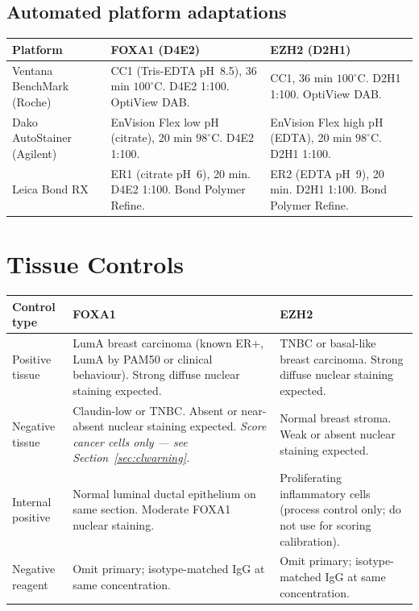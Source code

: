 \documentclass[11pt, a4paper]{article}
\begin{document}
\subsection{Automated platform adaptations}

\begin{center}
\begin{tabular}{p{3cm}p{5.5cm}p{5.5cm}}
\toprule
\textbf{Platform} &
\textbf{FOXA1 (D4E2)} &
\textbf{EZH2 (D2H1)} \\
\midrule
Ventana BenchMark
(Roche) &
CC1 (Tris-EDTA pH~8.5),
36 min $100^\circ$C.
D4E2 1:100. OptiView DAB. &
CC1, 36 min $100^\circ$C.
D2H1 1:100. OptiView DAB. \\[0.4em]
Dako AutoStainer
(Agilent) &
EnVision Flex low pH (citrate),
20 min $98^\circ$C.
D4E2 1:100. &
EnVision Flex high pH (EDTA),
20 min $98^\circ$C.
D2H1 1:100. \\[0.4em]
Leica Bond RX &
ER1 (citrate pH~6), 20 min.
D4E2 1:100.
Bond Polymer Refine. &
ER2 (EDTA pH~9), 20 min.
D2H1 1:100.
Bond Polymer Refine. \\
\bottomrule
\end{tabular}
\end{center}

\section{Tissue Controls}

\begin{center}
\begin{tabular}{p{3cm}p{4.5cm}p{4.5cm}}
\toprule
\textbf{Control type} &
\textbf{FOXA1} & \textbf{EZH2} \\
\midrule
Positive tissue &
LumA breast carcinoma (known
ER$+$, LumA by PAM50 or clinical
behaviour). Strong diffuse
nuclear staining expected. &
TNBC or basal-like breast
carcinoma. Strong diffuse
nuclear staining expected. \\[0.4em]
Negative tissue &
Claudin-low or TNBC.
Absent or near-absent nuclear
staining expected.
\textit{Score cancer cells only
--- see Section~\ref{sec:clwarning}.} &
Normal breast stroma. Weak or
absent nuclear staining
expected. \\[0.4em]
Internal positive &
Normal luminal ductal epithelium
on same section. Moderate FOXA1
nuclear staining. &
Proliferating inflammatory cells
(process control only; do not
use for scoring calibration). \\[0.4em]
Negative reagent &
Omit primary; isotype-matched
IgG at same concentration. &
Omit primary; isotype-matched
IgG at same concentration. \\
\bottomrule
\end{tabular}
\end{center}
\end{document}

